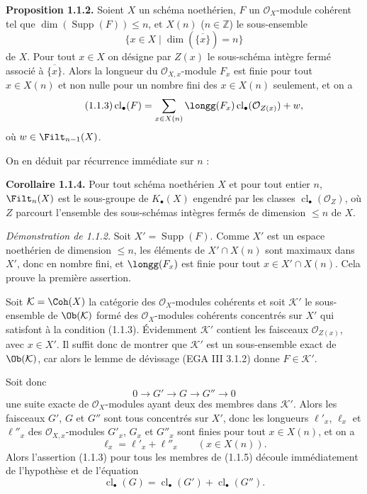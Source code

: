 \documentclass[11pt]{article}
\newcommand{\cl}{\operatorname{cl}}
\providecommand{\Supp}{\operatorname{Supp}}
\begin{document}
\textbf{Proposition 1.1.2.} Soient $X$ un schéma noethérien, $F$ un $\mathcal O_X$-module cohérent tel que $\dim(\Supp(F))\leq n$, et $X(n)$ ($n\in\mathbb Z$) le sous-ensemble
\[
\{x\in X\mid \dim(\overline{\{x\}})=n\}
\]
de $X$. Pour tout $x\in X$ on désigne par $Z(x)$ le sous-schéma intègre fermé associé à $\overline{\{x\}}$. Alors la longueur du $\mathcal O_{X,x}$-module $F_x$ est finie pour tout $x\in X(n)$ et non nulle pour un nombre fini des $x\in X(n)$ seulement, et on a
\begin{equation}\tag{1.1.3}
\cl_\bullet(F)=\sum_{x\in X(n)}\longg(F_x)\cl_\bullet(\mathcal O_{Z(x)})+w,
\end{equation}
où $w\in\Filt_{n-1}(X)$.

On en déduit par récurrence immédiate sur $n$ :

\textbf{Corollaire 1.1.4.} Pour tout schéma noethérien $X$ et pour tout entier $n$, $\Filt_n(X)$ est le sous-groupe de $K_\bullet(X)$ engendré par les classes $\cl_\bullet(\mathcal O_Z)$, où $Z$ parcourt l'ensemble des sous-schémas intègres fermés de dimension $\leq n$ de $X$.

\emph{Démonstration de 1.1.2.} Soit $X'=\Supp(F)$. Comme $X'$ est un espace noethérien de dimension $\leq n$, les éléments de $X'\cap X(n)$ sont maximaux dans $X'$, donc en nombre fini, et $\longg(F_x)$ est finie pour tout $x\in X'\cap X(n)$. Cela prouve la première assertion.

Soit $\mathcal K=\Coh(X)$ la catégorie des $\mathcal O_X$-modules cohérents et soit $\mathcal K'$ le sous-ensemble de $\Ob(\mathcal K)$ formé des $\mathcal O_X$-modules cohérents concentrés sur $X'$ qui satisfont à la condition (1.1.3). Évidemment $\mathcal K'$ contient les faisceaux $\mathcal O_{Z(x)}$, avec $x\in X'$. Il suffit donc de montrer que $\mathcal K'$ est un sous-ensemble exact de $\Ob(\mathcal K)$, car alors le lemme de dévissage (EGA III 3.1.2) donne $F\in\mathcal K'$.

Soit donc
\begin{equation}\tag{1.1.5}
0\longrightarrow G'\longrightarrow G\longrightarrow G''\longrightarrow0
\end{equation}
une suite exacte de $\mathcal O_X$-modules ayant deux des membres dans $\mathcal K'$. Alors les faisceaux $G'$, $G$ et $G''$ sont tous concentrés sur $X'$, donc les longueurs $\ell'_x$, $\ell_x$ et $\ell''_x$ des $\mathcal O_{X,x}$-modules $G'_x$, $G_x$ et $G''_x$ sont finies pour tout $x\in X(n)$, et on a
\begin{equation}\tag{1.1.6}
\ell_x=\ell'_x+\ell''_x\qquad (x\in X(n)).
\end{equation}
Alors l'assertion (1.1.3) pour tous les membres de (1.1.5) découle immédiatement de l'hypothèse et de l'équation
\begin{equation}\tag{1.1.7}
\cl_\bullet(G)=\cl_\bullet(G')+\cl_\bullet(G'').
\end{equation}
\end{document}
